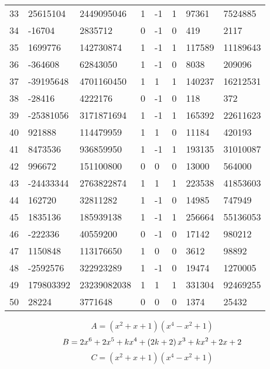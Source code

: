 \documentclass{amsart}
\begin{document}
\begin{longtable}{|l|l|l|lllll|}
33&25615104&2449095046&1&-1&1&97361&7524885\\
34&-16704&2835712&0&-1&0&419&2117\\
35&1699776&142730874&1&-1&1&117589&11189643\\
36&-364608&62843050&1&-1&0&8038&209096\\
37&-39195648&4701160450&1&1&1&140237&16212531\\
38&-28416&4222176&0&-1&0&118&372\\
39&-25381056&3171871694&1&-1&1&165392&22611623\\
40&921888&114479959&1&1&0&11184&420193\\
41&8473536&936859950&1&-1&1&193135&31010087\\
42&996672&151100800&0&0&0&13000&564000\\
43&-24433344&2763822874&1&1&1&223538&41853603\\
44&162720&32811282&1&-1&0&14985&747949\\
45&1835136&185939138&1&-1&1&256664&55136053\\
46&-222336&40559200&0&-1&0&17142&980212\\
47&1150848&113176650&1&0&0&3612&98892\\
48&-2592576&322923289&1&-1&0&19474&1270005\\
49&179803392&23239082038&1&1&1&331304&92469255\\
50&28224&3771648&0&0&0&1374&25432\\
\hline
\end{longtable}
$$A=(x^2
 + x
 + 1)(x^4
 - x^2
 + 1)$$
$$B=2\*x^6
 + 2\*x^5
 + k\*x^4
 + \left(2\*k
 + 2\right) \*x^3
 + k\*x^2
 + 2\*x
 + 2$$
$$C=(x^2
 + x
 + 1)(x^4
 - x^2
 + 1)$$
\end{document}
